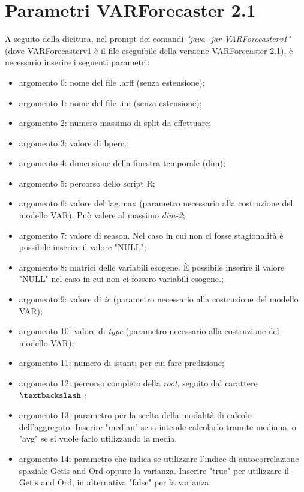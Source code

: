 \documentclass[12pt,a4paper,oneside,openright]{book}
\begin{document}
\section*{Parametri VARForecaster 2.1}
A seguito della dicitura, nel prompt dei comandi \textit{"java -jar VARForecasterv1"} (dove VARForecasterv1 è il file eseguibile della versione VARForecaster 2.1), è necessario inserire i seguenti parametri:
\begin{itemize}
\item argomento 0: nome del file .arff (senza estensione);
\item argomento 1: nome del file .ini (senza estensione);
\item argomento 2: numero massimo di split da effettuare;
\item argomento 3: valore di bperc.;
\item argomento 4: dimensione della finestra temporale (dim);
\item argomento 5: percorso dello script R;
\item argomento 6: valore del lag.max (parametro necessario alla costruzione del modello VAR). Può valere al massimo \textit{dim-2};
\item argomento 7: valore di season. Nel caso in cui non ci fosse stagionalità è possibile inserire il valore "NULL";
\item argomento 8: matrici delle variabili esogene. È possibile inserire il valore "NULL" nel caso in cui non ci fossero variabili esogene.;
\item argomento 9: valore di \textit{ic} (parametro necessario alla costruzione del modello VAR);
\item argomento 10: valore di \textit{type} (parametro necessario alla costruzione del modello VAR);
\item argomento 11: numero di istanti per cui fare predizione;
\item argomento 12: percorso completo della \textit{root}, seguito dal carattere $\textbackslash$ ;
\item argomento 13: parametro per la scelta della modalità di calcolo dell'aggregato. Inserire "median" se si intende calcolarlo tramite mediana, o "avg" se si vuole farlo utilizzando la media.
\item argomento 14: parametro che indica se utilizzare l'indice di autocorrelazione spaziale Getis and Ord oppure la varianza. Inserire "true" per utilizzare il Getis and Ord, in alternativa "false" per la varianza.
\end{itemize}
\end{document}

